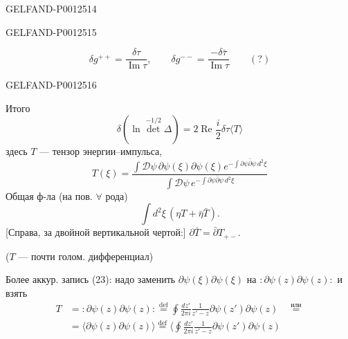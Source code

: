 \begin{GelfandAdjacentEvidence}{GELFAND-P001251}{4}

\end{GelfandAdjacentEvidence}
\begin{GelfandAdjacentEvidence}{GELFAND-P001251}{5}

\begin{equation*}
\delta g^{++}=\frac{\delta\tau}{\operatorname{Im}\tau},
\qquad \delta g^{--}=\frac{-\delta\bar\tau}{\operatorname{Im}\tau}
\qquad (?)
\end{equation*}
\end{GelfandAdjacentEvidence}
\begin{GelfandAdjacentEvidence}{GELFAND-P001251}{6}

\end{GelfandAdjacentEvidence}

Итого
\begin{equation*}
\delta(\ln\det^{-1/2}\Delta)
=2\operatorname{Re}\frac{i}{2}\delta\tau\langle T\rangle\tag{22}
\end{equation*}
здесь $T$ — тензор энергии–импульса,
\begin{equation*}
T(\xi)=\frac{\int\mathcal D\psi\,\partial\psi(\xi)\partial\psi(\xi)
e^{-\int\partial\psi\bar\partial\psi\,d^2\xi}}
{\int\mathcal D\psi\,e^{-\int\partial\psi\bar\partial\psi\,d^2\xi}}\tag{23}
\end{equation*}
Общая ф-ла (на пов. $\forall$ рода)
\begin{equation*}
\int d^2\xi\,(\eta T+\bar\eta\bar T).\tag{24}
\end{equation*}
[Справа, за двойной вертикальной чертой:] $\partial\bar T=\bar\partial T_{+-}$.

($T$ — почти голом. дифференциал)

Более аккур. запись (23): надо заменить $\partial\psi(\xi)\partial\psi(\xi)$ на $:\partial\psi(z)\partial\psi(z):$ и взять
\begin{equation*}
\begin{aligned}
T&=:\partial\psi(z)\partial\psi(z):
\overset{\mathrm{def}}{=}\oint\frac{dz'}{2\pi i}\frac{1}{z'-z}
\partial\psi(z')\partial\psi(z)\quad\overset{\text{или}}{=}\\
&=\langle\partial\psi(z)\partial\psi(z)\rangle
\overset{\mathrm{def}}{=}\biggl\langle\oint\frac{dz'}{2\pi i}\frac{1}{z'-z}
\partial\psi(z')\partial\psi(z)
\end{aligned}\tag{25}
\end{equation*}


